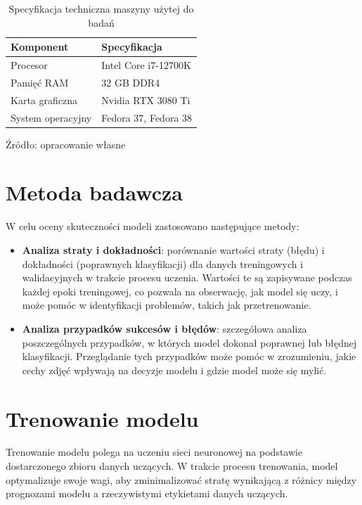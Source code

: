 \begin{table}[H]
\centering
\caption{Specyfikacja techniczna maszyny użytej do badań}
\begin{tabular}{|l|l|}
\hline
\textbf{Komponent} & \textbf{Specyfikacja} \\ \hline
Procesor & Intel Core i7-12700K \\ \hline
Pamięć RAM & 32 GB DDR4 \\ \hline
Karta graficzna & Nvidia RTX 3080 Ti \\ \hline
System operacyjny & Fedora 37, Fedora 38 \\ \hline
\end{tabular}
\begin{center}
\footnotesize{Źródło: opracowanie własne}
\end{center}
\end{table}

\section{Metoda badawcza}
W celu oceny skuteczności modeli zastosowano następujące metody:
\begin{itemize}
    \item \textbf{Analiza straty i dokładności}: porównanie wartości straty (błędu) i dokładności (poprawnych klasyfikacji) dla danych treningowych i walidacyjnych w trakcie procesu uczenia. Wartości te są zapisywane podczas każdej epoki treningowej, co pozwala na obserwację, jak model się uczy, i może pomóc w identyfikacji problemów, takich jak przetrenowanie.
    
    \item \textbf{Analiza przypadków sukcesów i błędów}: szczegółowa analiza poszczególnych przypadków, w których model dokonał poprawnej lub błędnej klasyfikacji. Przeglądanie tych przypadków może pomóc w zrozumieniu, jakie cechy zdjęć wpływają na decyzje modelu i gdzie model może się mylić.
\end{itemize}

\section{Trenowanie modelu}
Trenowanie modelu polega na uczeniu sieci neuronowej na podstawie dostarczonego zbioru danych uczących. W trakcie procesu trenowania, model optymalizuje swoje wagi, aby zminimalizować stratę wynikającą z różnicy między prognozami modelu a rzeczywistymi etykietami danych uczących.

